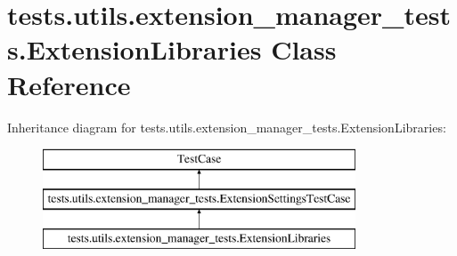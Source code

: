 \hypertarget{classtests_1_1utils_1_1extension__manager__tests_1_1ExtensionLibraries}{\section{tests.\+utils.\+extension\+\_\+manager\+\_\+tests.\+Extension\+Libraries Class Reference}
\label{classtests_1_1utils_1_1extension__manager__tests_1_1ExtensionLibraries}
}
Inheritance diagram for tests.\+utils.\+extension\+\_\+manager\+\_\+tests.\+Extension\+Libraries\+:\begin{figure}[H]
\begin{center}
\leavevmode
\includegraphics[height=3.000000cm]{classtests_1_1utils_1_1extension__manager__tests_1_1ExtensionLibraries}
\end{center}
\end{figure}
